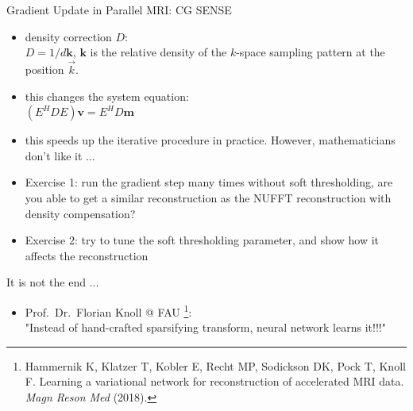 \begin{frame}{Gradient Update in Parallel MRI: CG SENSE}

	\begin{itemize}
		\item density correction $D$:\\
		$D = 1 / d \mathbf{k}$, $\mathbf{k}$ is the relative density of the $k$-space sampling pattern at the position $\vec{k}$.
		\vspace{2em}
		\item this changes the system equation:\\
		$(E^H D E) \mathbf{v} = E^H D \mathbf{m}$
		\vspace{2em}
		\item <2-> this speeds up the iterative procedure in practice. However, mathematicians don't like it ...
		\vspace{1em}
		\item <3-> Exercise 1: run the gradient step many times without soft thresholding, are you able to get a similar reconstruction as the NUFFT reconstruction with density compensation?
		\vspace{1em}
		\item <4-> Exercise 2: try to tune the soft thresholding parameter, and show how it affects the reconstruction

	\end{itemize}

\end{frame}



\begin{frame}{It is not the end ...}
	\begin{itemize}
		\item Prof.~Dr.~Florian Knoll @ FAU \footnote{Hammernik K, Klatzer T, Kobler E, Recht MP, Sodickson DK, Pock T, Knoll F. Learning a variational network for reconstruction of accelerated MRI data. \textit{Magn Reson Med} (2018).}:\\
		"Instead of hand-crafted sparsifying transform, neural network learns it!!!"
	\end{itemize}
\end{frame}
